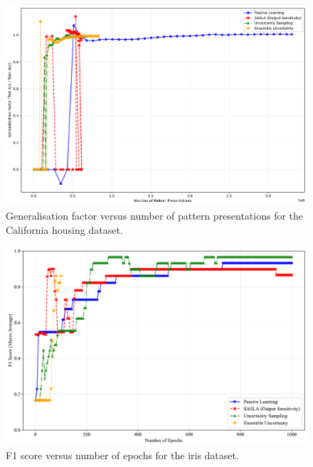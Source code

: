 \documentclass[10pt, conference]{IEEEtran}
\begin{document}
\begin{figure}[!t]
	\centering
	\includegraphics[width=\linewidth]{../results/housing/generalization_factor_vs_presentations.pdf}
	\caption{Generalisation factor versus number of pattern presentations for the California housing dataset.}
	\label{fig:gf_housing}
\end{figure}



\begin{figure}[!t]
	\centering
	\includegraphics[width=\linewidth]{../results/iris/f1_score_vs_epochs.pdf}
	\caption{F1 score versus number of epochs for the iris dataset.}
	\label{fig:f1_iris}
\end{figure}
\end{document}
